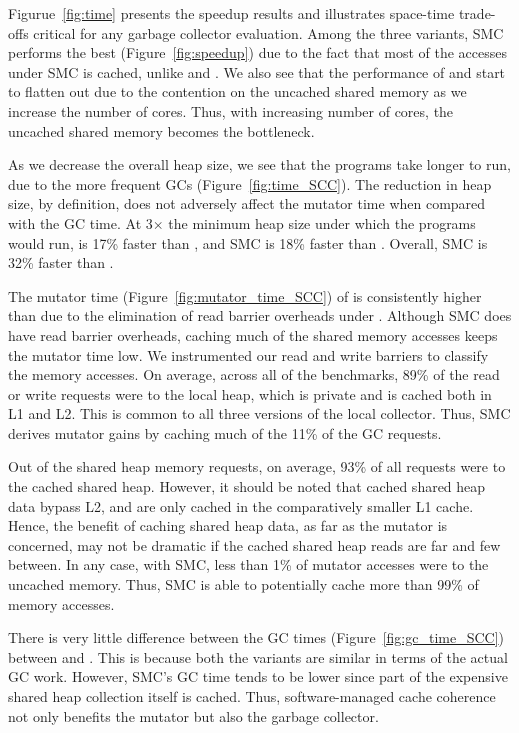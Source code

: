 Figurue~\ref{fig:time} presents the speedup results and illustrates space-time
trade-offs critical for any garbage collector evaluation. Among the three
variants, SMC performs the best (Figure~\ref{fig:speedup}) due to the fact that
most of the accesses under SMC is cached, unlike \lc and \prc. We also see that
the performance of \lc and \prc start to flatten out due to the contention on the
uncached shared memory as we increase the number of cores. Thus, with
increasing number of cores, the uncached shared memory becomes the bottleneck.

As we decrease the overall heap size, we see that the programs take longer to
run, due to the more frequent GCs (Figure~\ref{fig:time_SCC}). The reduction in
heap size, by definition, does not adversely affect the mutator time when
compared with the GC time. At 3$\times$ the minimum heap size under which the
programs would run, \prc is 17\% faster than \lc, and SMC is 18\% faster than
\prc. Overall, SMC is 32\% faster than \lc.

The mutator time (Figure~\ref{fig:mutator_time_SCC}) of \lc is consistently
higher than \prc due to the elimination of read barrier overheads under \prc.
Although SMC does have read barrier overheads, caching much of the shared
memory accesses keeps the mutator time low. We instrumented our read and write
barriers to classify the memory accesses. On average, across all of the
benchmarks, 89\% of the read or write requests were to the local heap, which is
private and is cached both in L1 and L2. This is common to all three versions
of the local collector. Thus, SMC derives mutator gains by caching much of the
11\% of the GC requests.

Out of the shared heap memory requests, on average, 93\% of all requests were
to the cached shared heap. However, it should be noted that cached shared heap
data bypass L2, and are only cached in the comparatively smaller L1 cache.
Hence, the benefit of caching shared heap data, as far as the mutator is
concerned, may not be dramatic if the cached shared heap reads are far and few
between. In any case, with SMC, less than 1\% of mutator accesses were to the
uncached memory. Thus, SMC is able to potentially cache more than 99\% of
memory accesses.

There is very little difference between the GC times
(Figure~\ref{fig:gc_time_SCC}) between \lc and \prc. This is because both the
variants are similar in terms of the actual GC work. However, SMC's GC time
tends to be lower since part of the expensive shared heap collection itself is
cached. Thus, software-managed cache coherence not only benefits the mutator
but also the garbage collector.

